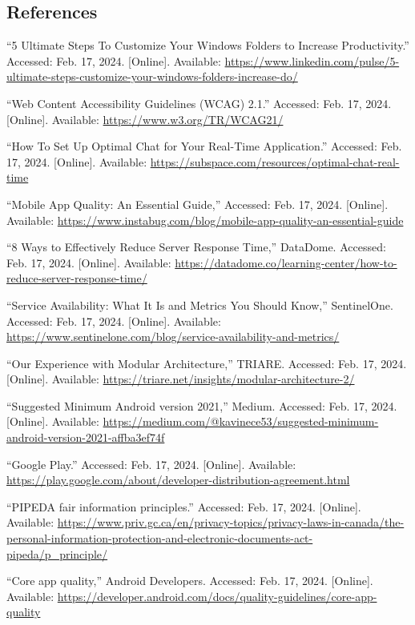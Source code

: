 \documentclass[]{article}
\begin{document}
\subsection{References}
\label{sub:references}
	\begin{thebibliography}{99}
		 “5 Ultimate Steps To Customize Your Windows Folders to Increase Productivity.” Accessed: Feb. 17, 2024. [Online]. Available: \url{https://www.linkedin.com/pulse/5-ultimate-steps-customize-your-windows-folders-increase-do/}

		 “Web Content Accessibility Guidelines (WCAG) 2.1.” Accessed: Feb. 17, 2024. [Online]. Available: \url{https://www.w3.org/TR/WCAG21/}

		 “How To Set Up Optimal Chat for Your Real-Time Application.” Accessed: Feb. 17, 2024. [Online]. Available: \url{https://subspace.com/resources/optimal-chat-real-time}

		 “Mobile App Quality: An Essential Guide,” Accessed: Feb. 17, 2024. [Online]. Available: \url{https://www.instabug.com/blog/mobile-app-quality-an-essential-guide}

		 “8 Ways to Effectively Reduce Server Response Time,” DataDome. Accessed: Feb. 17, 2024. [Online]. Available: \url{https://datadome.co/learning-center/how-to-reduce-server-response-time/}

		 “Service Availability: What It Is and Metrics You Should Know,” SentinelOne. Accessed: Feb. 17, 2024. [Online]. Available: \url{https://www.sentinelone.com/blog/service-availability-and-metrics/}

		 “Our Experience with Modular Architecture,” TRIARE. Accessed: Feb. 17, 2024. [Online]. Available: \url{https://triare.net/insights/modular-architecture-2/}

		 “Suggested Minimum Android version 2021,” Medium. Accessed: Feb. 17, 2024. [Online]. Available: \url{https://medium.com/@kavinece53/suggested-minimum-android-version-2021-affba3ef74f}

		 “Google Play.” Accessed: Feb. 17, 2024. [Online]. Available: \url{https://play.google.com/about/developer-distribution-agreement.html}

		 “PIPEDA fair information principles.” Accessed: Feb. 17, 2024. [Online]. Available: \url{https://www.priv.gc.ca/en/privacy-topics/privacy-laws-in-canada/the-personal-information-protection-and-electronic-documents-act-pipeda/p_principle/}

		 “Core app quality,” Android Developers. Accessed: Feb. 17, 2024. [Online]. Available: \url{https://developer.android.com/docs/quality-guidelines/core-app-quality}
	\end{thebibliography}
\end{document}
